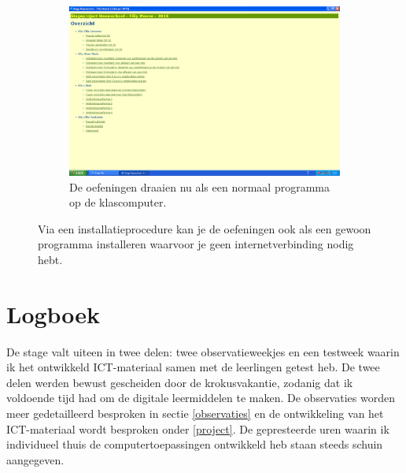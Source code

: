 \documentclass[a4paper,11pt]{article}
\theoremstyle{definition}
\begin{document}
\begin{itemize}
\begin{itemize}
\begin{figure}[h!]
        \begin{subfigure}{1\textwidth}
           \centering
                \includegraphics[scale=0.3]{normaalprogramma.png}
                \caption{De oefeningen draaien nu als een normaal programma op de klascomputer.}
        \end{subfigure}
        
           \caption{Via een installatieprocedure kan je de oefeningen ook als een gewoon programma installeren waarvoor je geen internetverbinding nodig hebt.}\label{installatie}
\end{figure}
\clearpage
\section{Logboek}\label{logboek}
De stage valt uiteen in twee delen: twee observatieweekjes en een testweek waarin ik het ontwikkeld ICT-materiaal samen
met de leerlingen getest heb. De twee delen werden bewust gescheiden door de krokusvakantie, zodanig dat ik voldoende tijd had 
om de digitale leermiddelen te maken. De observaties worden meer gedetailleerd besproken in sectie \ref{observaties} en de ontwikkeling
van het ICT-materiaal wordt besproken onder \ref{project}. De gepresteerde uren waarin ik 
individueel thuis de computertoepassingen ontwikkeld heb staan steeds schuin 
aangegeven.

\end{itemize}
\end{itemize}
\end{document}
